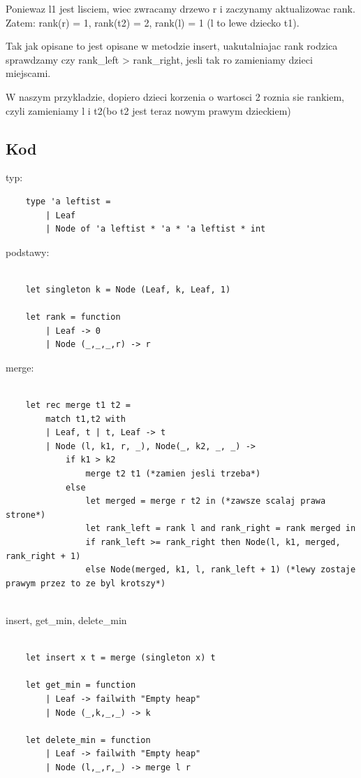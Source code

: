 \documentclass{article}
\begin{document}
Poniewaz l1 jest lisciem, wiec zwracamy drzewo r i zaczynamy aktualizowac rank. Zatem: rank(r) = 1, rank(t2) = 2, rank(l) = 1 (l to lewe dziecko t1).

Tak jak opisane to jest opisane w metodzie insert, uakutalniajac rank rodzica sprawdzamy czy rank\_left > rank\_right, jesli tak ro zamieniamy dzieci miejscami.

W naszym przykladzie, dopiero dzieci korzenia o wartosci 2 roznia sie rankiem, czyli zamieniamy l i t2(bo t2 jest teraz nowym prawym dzieckiem)

\subsection{Kod}

typ:
\begin{lstlisting}
    type 'a leftist = 
        | Leaf
        | Node of 'a leftist * 'a * 'a leftist * int
\end{lstlisting}

podstawy:

\begin{lstlisting}
    
    let singleton k = Node (Leaf, k, Leaf, 1)

    let rank = function
        | Leaf -> 0
        | Node (_,_,_,r) -> r

\end{lstlisting}

merge:

\begin{lstlisting}

    let rec merge t1 t2 = 
        match t1,t2 with 
        | Leaf, t | t, Leaf -> t
        | Node (l, k1, r, _), Node(_, k2, _, _) ->
            if k1 > k2 
                merge t2 t1 (*zamien jesli trzeba*)
            else 
                let merged = merge r t2 in (*zawsze scalaj prawa strone*)
                let rank_left = rank l and rank_right = rank merged in 
                if rank_left >= rank_right then Node(l, k1, merged, rank_right + 1)
                else Node(merged, k1, l, rank_left + 1) (*lewy zostaje prawym przez to ze byl krotszy*)
    
\end{lstlisting}

insert, get\_min, delete\_min

\begin{lstlisting}

    let insert x t = merge (singleton x) t

    let get_min = function
        | Leaf -> failwith "Empty heap"
        | Node (_,k,_,_) -> k

    let delete_min = function
        | Leaf -> failwith "Empty heap"
        | Node (l,_,r,_) -> merge l r
    
\end{lstlisting}
\end{document}
